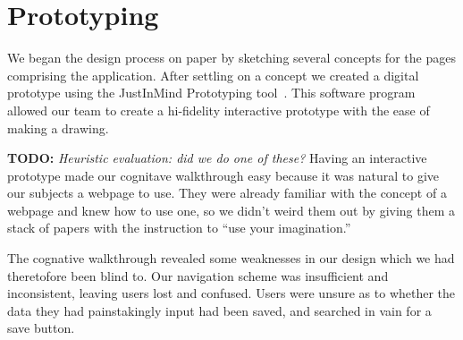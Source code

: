 \documentclass{sigchi-ext}
\begin{document}
\section{Prototyping}
We began the design process on paper by sketching several concepts for the
pages comprising the application. After settling on a concept we created a
digital prototype using the JustInMind Prototyping tool~\cite{justinmind}. This
software program allowed our team to create a hi-fidelity interactive prototype
with the ease of making a drawing. 

\textbf{TODO:} \textit{Heuristic evaluation: did we do one of these?}
Having an interactive prototype made our cognitave walkthrough easy because it was
natural to give our subjects a webpage to use. They were already familiar with the
concept of a webpage and knew how to use one, so we didn't weird them out by giving
them a stack of papers with the instruction to ``use your imagination.''

The cognative walkthrough revealed some weaknesses in our design which we had
theretofore been blind to. Our navigation scheme was insufficient and
inconsistent, leaving users lost and confused. Users were unsure as to whether
the data they had painstakingly input had been saved, and searched in vain for
a save button.
\end{document}
